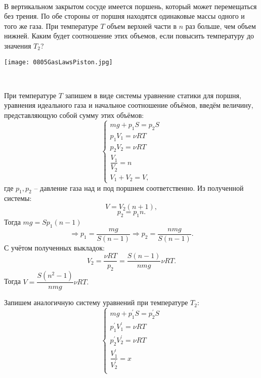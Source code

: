 \begin{ex}
\hspace{0pt} \\
\begin{minipage}{.65\textwidth}
В вертикальном закрытом сосуде имеется поршень, который может перемещаться без трения. 
По обе стороны от поршня находятся одинаковые массы одного и того же газа. 
При температуре $T$ объем верхней части в $n$ раз больше, чем объем нижней. 
Каким будет соотношение этих объемов, если повысить температуру до значения $T_2$?
\end{minipage}
\begin{minipage}{.35\textwidth}
\centering
\texttt{[image: 0805GasLawsPiston.jpg]}
\end{minipage}
\begin{sol}
\hspace{0pt} \\
\begin{minipage}{.5\textwidth}
При температуре $T$ запишем в виде системы уравнение статики для поршня, уравнения идеального газа и начальное соотношение объёмов, введём величину, представляющую собой сумму этих объёмов:
		\begin{equation}
		\begin{cases}
		mg + p_{1}S = p_{2}S\\
		p_{1}V_{1}=\nu RT\\
		p_{2}V_{2}=\nu RT\\
		\dfrac{V_{1}}{V_{2}}=n\\
		V_{1}+V_{2}=V,
		\end{cases}
		\end{equation}
где $p_{1}, p_{2}$ -- давление газа над и под поршнем соответственно.
Из полученной системы: $$V=V_{2}(n+1),$$ $$p_{2}=p_{1}n.$$ Тогда $mg=Sp_{1}(n-1)$ $$\Rightarrow p_{1}=\dfrac{mg}{S(n-1)} \Rightarrow p_{2}=\dfrac{nmg}{S(n-1)}.$$
С учётом полученных выкладок: $$V_{2} = \dfrac{\nu RT}{p_{2}}=\dfrac{S(n-1)}{nmg}\nu RT.$$
Тогда $V=\dfrac{S(n^2-1)}{nmg}\nu RT.$
\end{minipage}
\begin{minipage}{.5\textwidth}
Запишем аналогичную систему уравнений при температуре $T_{2}$:
\begin{equation}
\begin{cases}
mg + p_{1}^{'}S = p_{2}^{'}S\\
p_{1}^{'}V_{1}^{'}=\nu RT\\
p_{2}^{'}V_{2}^{'}=\nu RT\\
\dfrac{V_{1}^{'}}{V_{2}^{'}}=x\\

\end{cases}
\end{equation}
\end{minipage}
\end{sol}
\end{ex}
